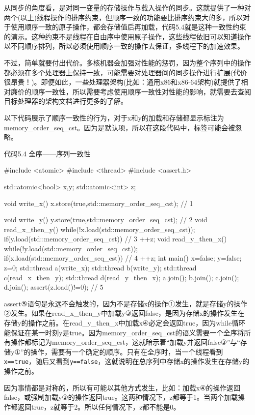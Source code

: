 从同步的角度看，是对同一变量的存储操作与载入操作的同步。这就提供了一种对两个(以上)线程操作的排序约束，但顺序一致的功能要比排序约束大的多，所以对于使用顺序一致的原子操作，都会存储值后再加载，代码5.4就是这种一致性约束的演示。这种约束不是线程在自由序中使用原子操作，这些线程依旧可以知道操作以不同顺序排列，所以必须使用顺序一致的操作去保证，多线程下的加速效果。

不过，简单就要付出代价。多核机器会加强对性能的惩罚，因为整个序列中的操作都必须在多个处理器上保持一致，可能需要对处理器间的同步操作进行扩展(代价很昂贵！)。即便如此，一些处理器架构(比如：通用x86和x86-64架构)就提供了相对廉价的顺序一致性，所以需要考虑使用顺序一致性对性能的影响，就需要去查阅目标处理器的架构文档进行更多的了解。

以下代码展示了顺序一致性的行为，对于x和y的加载和存储都显示标注为memory\_order\_seq\_cst。因为是默认项，所以在这段代码中，标签可能会被忽略。

代码5.4 全序——序列一致性

\begin{cpp}
#include <atomic>
#include <thread>
#include <assert.h>

std::atomic<bool> x,y;
std::atomic<int> z;

void write_x()
{
  x.store(true,std::memory_order_seq_cst);  // 1
}

void write_y()
{
  y.store(true,std::memory_order_seq_cst);  // 2
}
void read_x_then_y()
{
  while(!x.load(std::memory_order_seq_cst));
  if(y.load(std::memory_order_seq_cst))  // 3
    ++z;
}
void read_y_then_x()
{
  while(!y.load(std::memory_order_seq_cst));
  if(x.load(std::memory_order_seq_cst))  // 4
    ++z;
}
int main()
{
  x=false;
  y=false;
  z=0;
  std::thread a(write_x);
  std::thread b(write_y);
  std::thread c(read_x_then_y);
  std::thread d(read_y_then_x);
  a.join();
  b.join();
  c.join();
  d.join();
  assert(z.load()!=0);  // 5
}
\end{cpp}

assert⑤语句是永远不会触发的，因为不是存储x的操作①发生，就是存储y的操作②发生。如果在read\_x\_then\_y中加载y③返回false，是因为存储x的操作发生在存储y的操作之前。在read\_y\_then\_x中加载x④必定会返回true，因为while循环能保证在某一时刻y是true。因为memory\_order\_seq\_cst的语义需要一个全序将所有操作都标记为memory\_order\_seq\_cst，这就暗示着“加载y并返回false③”与“存储y①”的操作，需要有一个确定的顺序。只有在全序时，当一个线程看到\texttt{x==true}，随后又看到\texttt{y==false}，这就说明在总序列中存储x的操作发生在存储y的操作之前。

因为事情都是对称的，所以有可能以其他方式发生，比如：加载x④的操作返回false，或强制加载y③的操作返回true。这两种情况下，z都等于1。当两个加载操作都返回true，z就等于2。所以任何情况下，z都不能是0。

